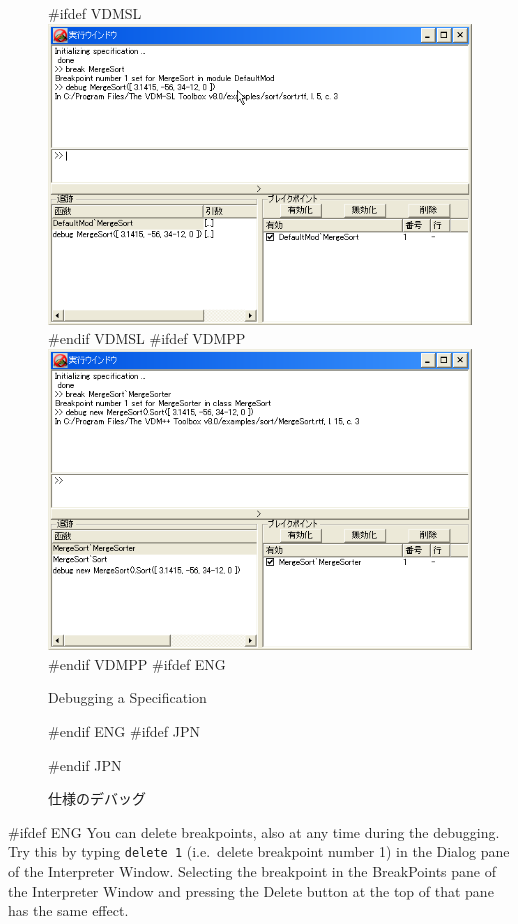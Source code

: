 \documentclass[\pformat,12pt]{article}
\newcommand{\guicmd}[1]{{\sf #1}}
\newcommand{\guicmd}[1]{{\gt #1}}
\begin{document}
\begin{figure}[tbh]
\begin{center}
#ifdef VDMSL
\includegraphics[width=\textwidth]{debugging-sl.png}
#endif VDMSL
#ifdef VDMPP
\includegraphics[width=15cm]{debugging-pp.png}
#endif VDMPP
#ifdef ENG
\caption{Debugging a Specification}
#endif ENG
#ifdef JPN
\caption{仕様のデバッグ}
#endif JPN

\label{fig:guidebug}
\end{center}
\end{figure}

#ifdef ENG
You can delete breakpoints, also at any time during the
debugging. Try this by typing 
{\tt delete 1} (i.e.\ delete breakpoint number 1) in the
\guicmd{Dialog} pane of the \guicmd{Interpreter Window}. Selecting the
breakpoint in the \guicmd{BreakPoints} pane of the \guicmd{Interpreter
  Window} and pressing the \guicmd{Delete} button at the top of that
pane has the same effect.
\end{document}
